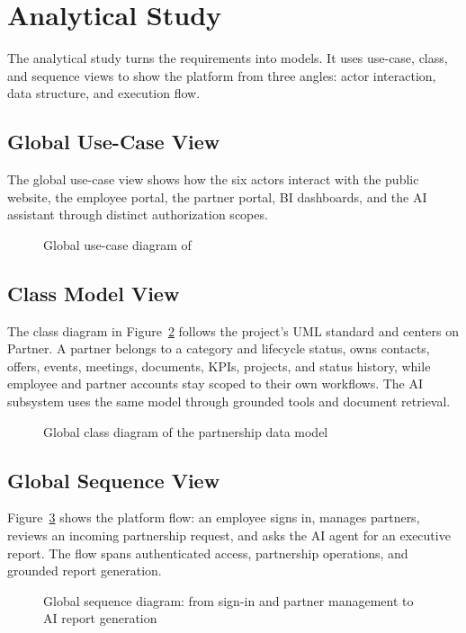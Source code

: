 \section{Analytical Study}
The analytical study turns the requirements into models. It uses use-case, class, and sequence views to show the platform from three angles: actor interaction, data structure, and execution flow.
\subsection{Global Use-Case View}
The global use-case view shows how the six actors interact with the public website, the employee portal, the partner portal, BI dashboards, and the AI assistant through distinct authorization scopes.

\begin{figure}[htbp]
  \centering
  \caption{Global use-case diagram of \projectname{}}
  \label{fig:global-use-case}
\end{figure}
\subsection{Class Model View}
The class diagram in Figure~\ref{fig:domain-model} follows the project's UML standard and centers on Partner. A partner belongs to a category and lifecycle status, owns contacts, offers, events, meetings, documents, KPIs, projects, and status history, while employee and partner accounts stay scoped to their own workflows. The AI subsystem uses the same model through grounded tools and document retrieval.

\begin{figure}[p]
  \centering
  \caption{Global class diagram of the partnership data model}
  \label{fig:domain-model}
\end{figure}
\subsection{Global Sequence View}
Figure~\ref{fig:request-sequence} shows the platform flow: an employee signs in, manages partners, reviews an incoming partnership request, and asks the AI agent for an executive report. The flow spans authenticated access, partnership operations, and grounded report generation.

\begin{figure}[htbp]
  \centering
  \caption{Global sequence diagram: from sign-in and partner management to AI report generation}
  \label{fig:request-sequence}
\end{figure}
